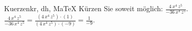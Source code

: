 \begin{MAufgabe}{Kuerzen}{kr, dh, MaTeX}
K\"urzen Sie soweit m\"oglich: $\frac{4\, x^4\, z^5}{- 36\, x^4\, z^5}$.\\ 
\ifLsg\MLoesung
\quad $\frac{4\, x^4\, z^5}{- 36\, x^4\, z^5}=\frac{(4\, x^4\, z^5)\cdot(1)}{(4\, x^4\, z^5)\cdot(-9)}=\frac{1}{-9}$.\else\relax\fi
 \end{MAufgabe}